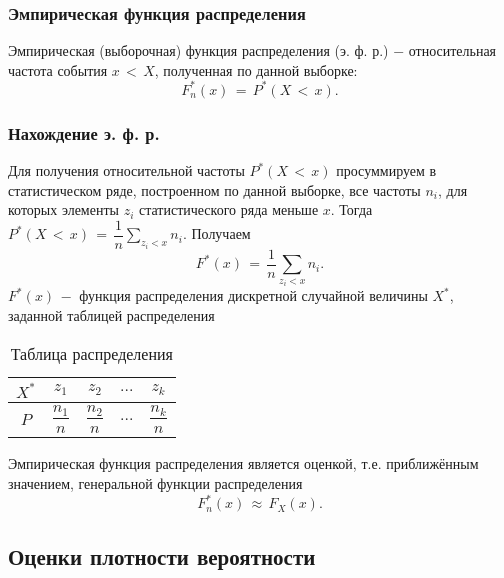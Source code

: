\subsubsection{Эмпирическая функция распределения}
\begin{flushleft}
	Эмпирическая (выборочная) функция распределения (э. ф. р.) $-$ относительная частота события $x \,<\, X$, полученная по данной выборке:
	\begin{equation}
		\label{19} F_n^*(x)\,=\, P^*(X \,<\, x).
	\end{equation}
\end{flushleft}

\subsubsection{Нахождение э. ф. р.}
\begin{flushleft}
	Для получения относительной частоты $ P^*(X \,<\, x)$ просуммируем в статистическом ряде, построенном по данной выборке, все частоты $n_i$, для которых элементы $z_i$ статистического ряда меньше $x$. Тогда $P^*(X \,<\, x)\,=\,\dfrac{1}{n}\displaystyle\sum_{z_i<x} n_i$. Получаем
	\begin{equation}
		\label{20} F^*(x)\,=\,\dfrac{1}{n}\displaystyle\sum_{z_i<x} n_i.
	\end{equation}
	$F^*(x)\,-$ функция распределения дискретной случайной величины	$X^*$, заданной таблицей распределения
	\begin{table}[H]
		\begin{center}
			\begin{tabular}{|c|c|c|c|c|}
				\hline
				$X^*$ & $z_1$ & $z_2$ & $...$ & $z_k$\\
				\hline
				$P$ & $\dfrac{n_1}{n}$ & $\dfrac{n_2}{n}$ & $...$ & $\dfrac{n_k}{n}$\\
				\hline
			\end{tabular}
		\end{center}
		\caption{\label{tab:1} Таблица распределения}
	\end{table}
	Эмпирическая функция распределения является оценкой, т.е. приближённым значением, генеральной функции распределения
	\begin{equation}
		\label{21} F_n^*(x)\,\approx\,F_X(x).
	\end{equation}
\end{flushleft}

\subsection{Оценки плотности вероятности}
